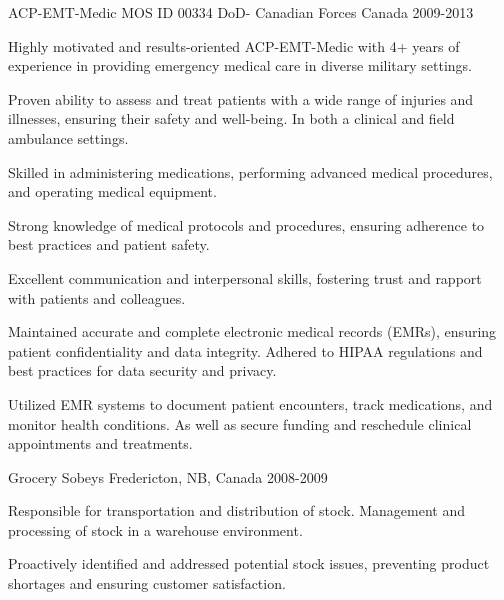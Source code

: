 \begin{cventries}
  \cventry
    {ACP-EMT-Medic MOS ID 00334} %
    {DoD- Canadian Forces} %
    {Canada} %
    {2009-2013} %
    {
      \begin{cvitems} %
        \item {Highly motivated and results-oriented ACP-EMT-Medic with 4+ years of experience in providing emergency medical care in diverse military settings.}
        \item {Proven ability to assess and treat patients with a wide range of injuries and illnesses, ensuring their safety and well-being. In both a clinical and field ambulance settings.}
        \item {Skilled in administering medications, performing advanced medical procedures, and operating medical equipment.}
        \item {Strong knowledge of medical protocols and procedures, ensuring adherence to best practices and patient safety.}
        \item {Excellent communication and interpersonal skills, fostering trust and rapport with patients and colleagues.}
        \item {Maintained accurate and complete electronic medical records (EMRs), ensuring patient confidentiality and data integrity. Adhered to HIPAA regulations and best practices for data security and privacy.}
        \item {Utilized EMR systems to document patient encounters, track medications, and monitor health conditions. As well as secure funding and reschedule clinical appointments and treatments.}
      \end{cvitems}
    }

  \cventry
    {Grocery} %
    {Sobeys} %
    {Fredericton, NB, Canada} %
    {2008-2009} %
    {
      \begin{cvitems} %
        \item {Responsible for transportation and distribution of stock. Management and processing of stock in a warehouse environment.}
        \item {Proactively identified and addressed potential stock issues, preventing product shortages and ensuring customer satisfaction.}
      \end{cvitems}
    }

\end{cventries}

